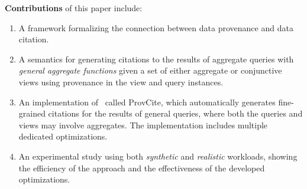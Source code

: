 {\textbf{Contributions}} of this paper include:
\begin{enumerate}
\item A framework formalizing the connection between data provenance and data citation.

\item %
A semantics for generating citations to the results of aggregate queries with {\em general aggregate functions} given a set of either aggregate or conjunctive views using provenance in the view and query instances. 

\item An implementation of \pba\ called ProvCite, which automatically generates fine-grained citations for the results of general queries, where both the queries and views may involve aggregates. The implementation includes multiple dedicated optimizations. 

\item 
An experimental study using both {\em synthetic}  and {\em realistic} workloads, showing the efficiency of the approach and the effectiveness of the developed optimizations.

\end{enumerate}

